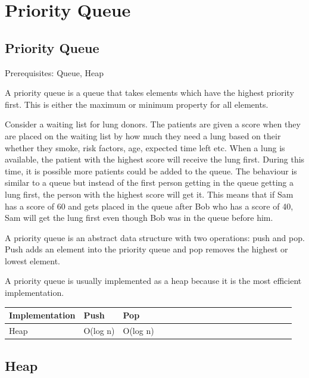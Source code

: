 \documentclass[11pt,oneside]{book}
\begin{document}
    \chapter{ Priority Queue }
        \section{ Priority Queue }
        

Prerequisites: Queue, Heap

A priority queue is a queue that takes elements which have the highest priority first. This is either the maximum or minimum property for all elements.

Consider a waiting list for lung donors. The patients are given a score when they are placed on the waiting list by how much they need a lung based on their whether they smoke, risk factors, age, expected time left etc. When a lung is available, the patient with the highest score will receive the lung first. During this time, it is possible more patients could be added to the queue. The behaviour is similar to a queue but instead of the first person getting in the queue getting a lung first, the person with the highest score will get it. This means that if Sam has a score of 60 and gets placed in the queue after Bob who has a score of 40, Sam will get the lung first even though Bob was in the queue before him.

A priority queue is an abstract data structure with two operations: push and pop. Push adds an element into the priority queue and pop removes the highest or lowest element.

A priority queue is usually implemented as a heap because it is the most efficient implementation.


        

\begin{center}\begin{tabulary}{0.4\linewidth}{|l|l|l|l|l|l|l|l|l|l|l|l|l|l|l|l|l|l|l}\hline


  Implementation &
  Push &
  Pop\\
\hline


  Heap &
  O(log n) &
  O(log n)\\

\hline\end{tabulary}\end{center}


        \section{ Heap }
        
\end{document}
